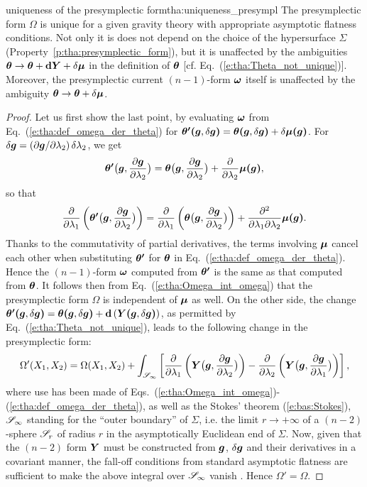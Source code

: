 \begin{tprop}{uniqueness of the presymplectic form}{tha:uniqueness_presympl}
The presymplectic form $\Omega$ is unique for a given gravity theory with
appropriate asymptotic flatness conditions. Not only it is
does not depend on the choice of the
hypersurface $\Sigma$ (Property~\ref{p:tha:presymplectic_form}),
but it is unaffected by the ambiguities
$\bm{\theta} \to \bm{\theta} + \mathbf{d} \bm{Y} + \delta\bm{\mu}$
in the definition of $\bm{\theta}$ [cf. Eq.~(\ref{e:tha:Theta_not_unique})].
Moreover, the presymplectic current $(n-1)$-form $\bm{\omega}$ itself is unaffected
by the ambiguity
$\bm{\theta} \to \bm{\theta} + \delta\bm{\mu}$.
\end{tprop}

\begin{proof}
Let us first show the last point, by evaluating $\bm{\omega}$
from Eq.~(\ref{e:tha:def_omega_der_theta})
for $\bm{\theta'}\textbf{(}\bm{g},\delta\bm{g}\textbf{)} = \bm{\theta}\textbf{(}\bm{g},\delta\bm{g}\textbf{)}
+ \delta \bm{\mu}\textbf{(}\bm{g}\textbf{)}$.
For $\delta\bm{g} = ({\partial \bm{g}}/{\partial \lambda_2}) \, \delta \lambda_2$, we get
\[
\bm{\theta'}\bm{\big(}\bm{g}, \frac{\partial \bm{g}}{\partial \lambda_2} \bm{\big)} = \bm{\theta}\bm{\big(}\bm{g}, \frac{\partial \bm{g}}{\partial \lambda_2} \bm{\big)} + \frac{\partial }{\partial \lambda_2} \bm{\mu}\textbf{(}\bm{g}\textbf{)} ,
\]
so that
\[
  \frac{\partial }{\partial \lambda_1}
        \left( \bm{\theta'}\bm{\big(}\bm{g}, \frac{\partial \bm{g}}{\partial \lambda_2} \bm{\big)}\right)
    = \frac{\partial }{\partial \lambda_1}
        \left( \bm{\theta}\bm{\big(}\bm{g}, \frac{\partial \bm{g}}{\partial \lambda_2} \bm{\big)}\right)
        + \frac{\partial^2}{\partial\lambda_1\partial\lambda_2} \bm{\mu}\textbf{(}\bm{g}\textbf{)}
 .
\]
Thanks to the commutativity of partial derivatives, the terms
involving $\bm{\mu}$ cancel each other when substituting $\bm{\theta'}$
for $\bm{\theta}$ in Eq.~(\ref{e:tha:def_omega_der_theta}).
Hence the $(n-1)$-form $\bm{\omega}$ computed from $\bm{\theta'}$
is the same as that computed from $\bm{\theta}$.
It follows then from Eq.~(\ref{e:tha:Omega_int_omega}) that
the presymplectic form $\Omega$ is independent of $\bm{\mu}$ as well.
On the other side,
the change  $\bm{\theta'}\textbf{(}\bm{g},\delta\bm{g}\textbf{)} = \bm{\theta}\textbf{(}\bm{g},\delta\bm{g}\textbf{)}
+ \mathbf{d} \left(\bm{Y}\textbf{(}\bm{g},\delta\bm{g}\textbf{)} \right)$, as permitted by Eq.~(\ref{e:tha:Theta_not_unique}),
leads to the following change in the presymplectic form:
\[
    \Omega'(X_1, X_2) = \Omega(X_1, X_2) + \int_{\mathscr{S}_\infty}
    \left[ \frac{\partial }{\partial \lambda_1}
        \left( \bm{Y}\bm{\big(}\bm{g}, \frac{\partial \bm{g}}{\partial \lambda_2} \bm{\big)}\right)
        - \frac{\partial }{\partial \lambda_2}\left( \bm{Y}\bm{\big(}\bm{g}, \frac{\partial \bm{g}}{\partial \lambda_1} \bm{\big)} \right) \right] ,
\]
where use has been made of Eqs.~(\ref{e:tha:Omega_int_omega})-(\ref{e:tha:def_omega_der_theta}),
as well as the Stokes' theorem (\ref{e:bas:Stokes}),
$\mathscr{S}_\infty$ standing for the ``outer boundary'' of $\Sigma$, i.e. the limit
$r\to +\infty$ of a $(n-2)$-sphere $\mathscr{S}_r$ of radius $r$ in the asymptotically Euclidean end
of $\Sigma$. Now, given that the $(n-2)$ form $\bm{Y}$ must be constructed from
$\bm{g}$, $\delta\bm{g}$ and their derivatives in a covariant manner, the fall-off
conditions from standard asymptotic flatness are sufficient to make
the above integral over $\mathscr{S}_\infty$ vanish \cite{IyerW94}. Hence $\Omega' = \Omega$.
\end{proof}


